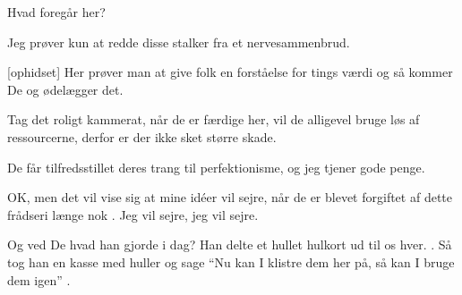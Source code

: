 \documentclass[a4paper,11pt]{article}
\begin{document}
\begin{sketch}

   Hvad foregår her?

   Jeg prøver kun at redde disse stalker fra et nervesammenbrud.

  [ophidset] Her prøver man at give folk en forståelse for
  tings værdi og så kommer De og ødelægger det.

   Tag det roligt kammerat, når de er færdige her, vil de
  alligevel bruge løs af ressourcerne, derfor er der ikke sket større
  skade.

   De får tilfredsstillet deres trang til perfektionisme, og
  jeg tjener gode penge.

   OK, men det vil vise sig at mine idéer vil sejre, når de
  er blevet forgiftet af dette frådseri længe nok .  Jeg vil sejre, jeg vil sejre.


   Og ved De hvad han gjorde i dag?  Han delte et hullet
  hulkort ud til os hver.  .  Så tog han en kasse med huller  og sage "`Nu kan I klistre dem her på, så kan I bruge
  dem igen"' .

\end{sketch}
\end{document}
